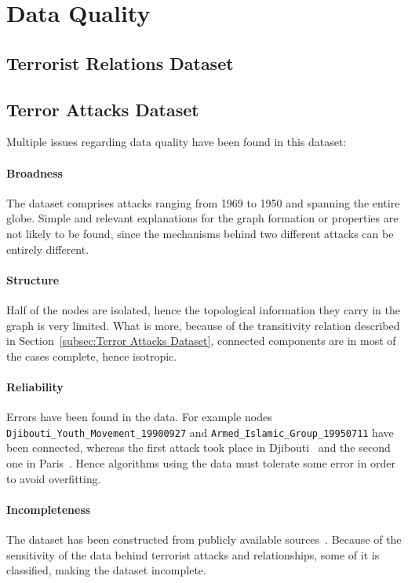 \section{Data Quality}
\label{sec:DataQuality}

\subsection{Terrorist Relations Dataset}

\subsection{Terror Attacks Dataset}
\label{subsec:terror attack quality}
Multiple issues regarding data quality have been found in this dataset:

\paragraph{Broadness} 
The dataset comprises attacks ranging from 1969 to 1950 and spanning the entire globe. Simple and relevant explanations for the graph formation or properties are not likely to be found, since the mechanisms behind two different attacks can be entirely different.

\paragraph{Structure} 
Half of the nodes are isolated, hence the topological information they carry in the graph is very limited. What is more, because of the transitivity relation described in Section~\ref{subsec:Terror Attacks Dataset}, connected components are in most of the cases complete, hence isotropic. 

\paragraph{Reliability} 
Errors have been found in the data. For example nodes
 \texttt{Djibouti\_Youth\_Movement\_19900927} 
 and 
 \texttt{Armed\_Islamic\_Group\_19950711} 
 have been connected, whereas the first attack took place in Djibouti~\cite{amnesty1991} and the second one in Paris~\cite{nouvelObs2007}. Hence algorithms using the data must tolerate some error in order to avoid overfitting.

\paragraph{Incompleteness}
The dataset has been constructed from publicly available sources~\cite{ZSG2006}. Because of the sensitivity of the data behind terrorist attacks and relationships, some of it is classified, making the dataset incomplete.